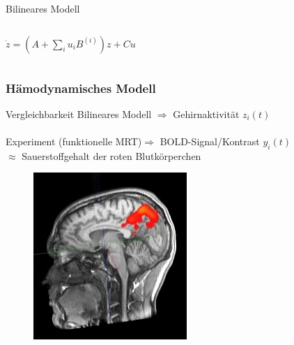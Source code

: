\documentclass{beamer}
\begin{document}
\begin{frame}{Bilineares Modell}
\begin{columns}
{\begin{minipage}{\textwidth}
					\hspace{5pt}
					$
					\dot{z} =(A+\sum_{i}u_iB^{(i)})z+Cu
					$
				\end{minipage}	
			}
		\end{columns}
	\end{frame}	
	
\subsubsection{Hämodynamisches Modell}
\begin{frame}{Vergleichbarkeit}
Bilineares Modell $\Rightarrow$ Gehirnaktivität $z_i(t)$\\~\\
Experiment (funktionelle MRT)$\Rightarrow$ BOLD-Signal/Kontrast $y_i(t)$\\
\hspace{3cm} $\approx$ Sauerstoffgehalt der roten Blutkörperchen 
\begin{figure}
{\includegraphics[width=0.3 \textwidth]{res/bold_signal.jpg}}
\end{figure}
\end{frame}
\end{document}
